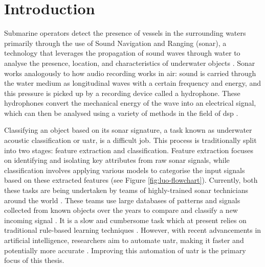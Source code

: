 \chapter{Introduction}


Submarine operators detect the presence of vessels in the surrounding waters primarily through the use of Sound Navigation and Ranging (sonar), a technology that leverages the propagation of sound waves through water to analyse the presence, location, and characteristics of underwater objects \cite{niu_advances_2023}. Sonar works analogously to how audio recording works in air: sound is carried through the water medium as longitudinal waves with a certain frequency and energy, and this pressure is picked up by a recording device called a hydrophone. These hydrophones convert the mechanical energy of the wave into an electrical signal, which can then be analysed using a variety of methods in the field of \acrfull{dsp} \cite{waite_sonar_2002, domingos_survey_2022}.

Classifying an object based on its sonar signature, a task known as underwater acoustic classification or \acrfull{uatr}, is a difficult job. This process is traditionally split into two stages: feature extraction and classification. Feature extraction focuses on identifying and isolating key attributes from raw sonar signals, while classification involves applying various models to categorise the input signals based on these extracted features (see Figure \ref{fig:luo-flowchart}). Currently, both these tasks are being undertaken by teams of highly-trained sonar technicians around the world \cite{aslam_underwater_2024}. These teams use large databases of patterns and signals collected from known objects over the years to compare and classify a new incoming signal \cite{niu_advances_2023}. It is a slow and cumbersome task which at present relies on traditional rule-based learning techniques \cite{neupane_review_2020}.  However, with recent advancements in artificial intelligence, researchers aim to automate \acrshort{uatr}, making it faster and potentially more accurate \cite{aslam_underwater_2024, neupane_review_2020}. Improving this automation of \acrshort{uatr} is the primary focus of this thesis.

